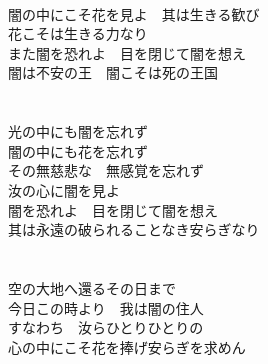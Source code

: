 \documentclass{genkou}
\begin{document}
　\\
　闇の中にこそ花を見よ　其は生きる歓び \\
　花こそは生きる力なり \\
　また闇を恐れよ　目を閉じて闇を想え \\
　闇は不安の王　闇こそは死の王国 \\
　\\
　\\
　光の中にも闇を忘れず \\
　闇の中にも花を忘れず \\
　その無慈悲な　無感覚を忘れず \\
　汝の心に闇を見よ \\
　闇を恐れよ　目を閉じて闇を想え \\
　其は永遠の破られることなき安らぎなり \\
　\\
　\\
　空の大地へ還るその日まで \\
　今日この時より　我は闇の住人 \\
　すなわち　汝らひとりひとりの \\
　心の中にこそ花を捧げ安らぎを求めん
\end{document}
